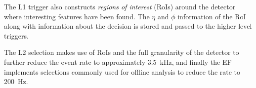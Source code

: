 The L1 trigger also constructs \emph{regions of interest} (RoIs) around the detector where interesting features have been found. The $\eta$ and $\phi$ information of the RoI along with information about the decision is stored and passed to the higher level triggers.

The L2 selection makes use of RoIs and the full granularity of the detector to further reduce the event rate to approximately \SI{3.5}{\kHz}, and finally the EF implements selections commonly used for offline analysis to reduce the rate to \SI{200}{\Hz}.
